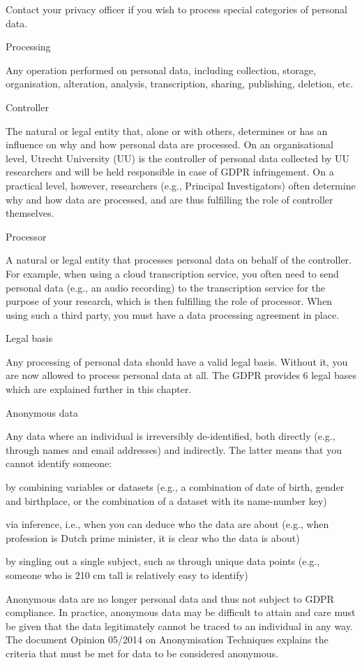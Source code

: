 \documentclass[
]{book}
\begin{document}
Contact your privacy officer if you wish to process special categories of personal data.

Processing

Any operation performed on personal data, including collection, storage, organisation, alteration, analysis, transcription, sharing, publishing, deletion, etc.

Controller

The natural or legal entity that, alone or with others, determines or has an influence on why and how personal data are processed. On an organisational level, Utrecht University (UU) is the controller of personal data collected by UU researchers and will be held responsible in case of GDPR infringement. On a practical level, however, researchers (e.g., Principal Investigators) often determine why and how data are processed, and are thus fulfilling the role of controller themselves.

Processor

A natural or legal entity that processes personal data on behalf of the controller. For example, when using a cloud transcription service, you often need to send personal data (e.g., an audio recording) to the transcription service for the purpose of your research, which is then fulfilling the role of processor. When using such a third party, you must have a data processing agreement in place.

Legal basis

Any processing of personal data should have a valid legal basis. Without it, you are now allowed to process personal data at all. The GDPR provides 6 legal bases which are explained further in this chapter.

Anonymous data

Any data where an individual is irreversibly de-identified, both directly (e.g., through names and email addresses) and indirectly. The latter means that you cannot identify someone:

by combining variables or datasets (e.g., a combination of date of birth, gender and birthplace, or the combination of a dataset with its name-number key)

via inference, i.e., when you can deduce who the data are about (e.g., when profession is Dutch prime minister, it is clear who the data is about)

by singling out a single subject, such as through unique data points (e.g., someone who is 210 cm tall is relatively easy to identify)

Anonymous data are no longer personal data and thus not subject to GDPR compliance. In practice, anonymous data may be difficult to attain and care must be given that the data legitimately cannot be traced to an individual in any way. The document Opinion 05/2014 on Anonymisation Techniques explains the criteria that must be met for data to be considered anonymous.
\end{document}
